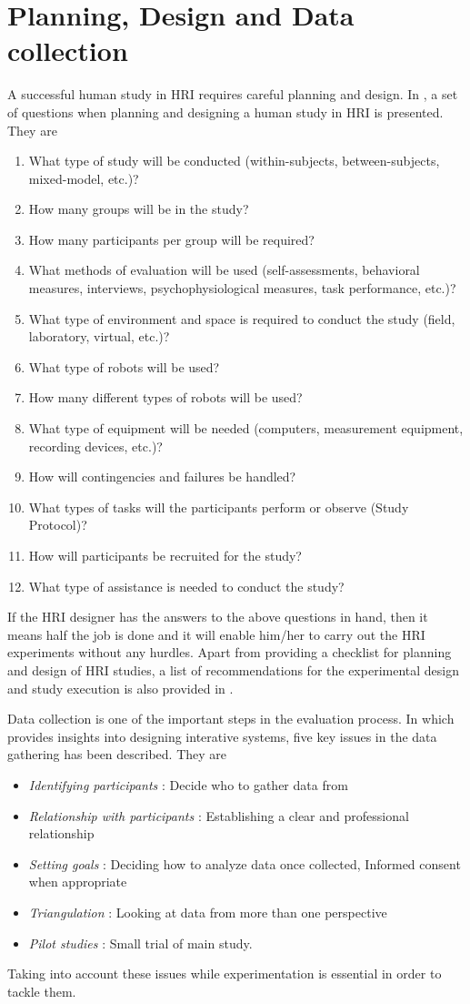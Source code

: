 {\section{Planning, Design and Data collection}
A successful human study in HRI requires careful planning and design. In \cite{Bethel2010}, a set of questions  when planning and designing a human study in HRI is presented. They are
\begin{enumerate}
\item What type of study will be conducted (within-subjects, between-subjects, mixed-model, etc.)?
\item How many groups will be in the study?
\item How many participants per group will be required?
\item What methods of evaluation will be used (self-assessments, behavioral measures, interviews, psychophysiological measures, task performance, etc.)?
\item What type of environment and space is required to conduct the study (field, laboratory, virtual, etc.)?
\item What type of robots will be used?
\item How many different types of robots will be used?
\item What type of equipment will be needed (computers, measurement equipment, recording devices, etc.)?
\item How will contingencies and failures be handled?
\item What types of tasks will the participants perform or observe (Study Protocol)?
\item How will participants be recruited for the study?
\item What type of assistance is needed to conduct the study?
\end{enumerate}
	If the HRI designer has the answers to the above questions in hand, then it means half the job is done and it will enable him/her to carry out the HRI experiments without any hurdles. Apart from providing a checklist for planning and design of HRI studies, a list of recommendations for the experimental design and study execution is also provided in \cite{Bethel2010}.
	
	Data collection is one of the important steps in the evaluation process. In \cite{Rogers2011} which provides insights into designing interative systems, five key issues in the data gathering has been described. They are 
\begin{itemize}
\item \emph{Identifying participants} : Decide who to gather data from
\item \emph{Relationship with participants} : Establishing a clear and professional relationship
\item \emph{Setting goals} : Deciding how to analyze data once collected, Informed consent when appropriate
\item \emph{Triangulation} : Looking at data from more than one perspective
\item \emph{Pilot studies} : Small trial of main study. 
\end{itemize}
Taking into account these issues while experimentation is essential in order to tackle them. 

}
